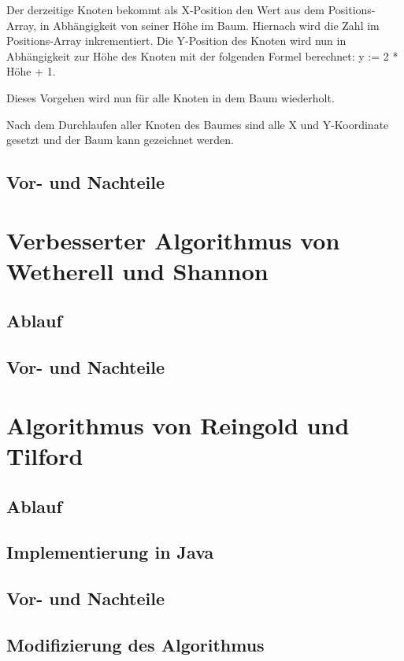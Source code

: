 Der derzeitige Knoten bekommt als X-Position den Wert aus dem Positions-Array, in Abhängigkeit von seiner Höhe im Baum. Hiernach wird die Zahl im Positions-Array inkrementiert. Die Y-Position des Knoten wird nun in Abhängigkeit zur Höhe des Knoten mit der folgenden Formel berechnet: y := 2 * Höhe + 1.

Dieses Vorgehen wird nun für alle Knoten in dem Baum wiederholt. 

Nach dem Durchlaufen aller Knoten des Baumes sind alle X und Y-Koordinate gesetzt und der Baum kann gezeichnet werden.

\subsection{Vor- und Nachteile}

\section{Verbesserter Algorithmus von Wetherell und Shannon}

\subsection{Ablauf}

\subsection{Vor- und Nachteile}

\section{Algorithmus von Reingold und Tilford}

\subsection{Ablauf}

\subsection{Implementierung in Java}

\subsection{Vor- und Nachteile}

\subsection{Modifizierung des Algorithmus}
